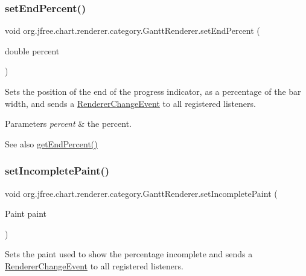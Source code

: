 \subsubsection{\texorpdfstring{set\+End\+Percent()}{setEndPercent()}}
{\footnotesize\ttfamily void org.\+jfree.\+chart.\+renderer.\+category.\+Gantt\+Renderer.\+set\+End\+Percent (\begin{DoxyParamCaption}\item[{double}]{percent }\end{DoxyParamCaption})}

Sets the position of the end of the progress indicator, as a percentage of the bar width, and sends a \mbox{\hyperlink{}{Renderer\+Change\+Event}} to all registered listeners.


\begin{DoxyParams}{Parameters}
{\em percent} & the percent.\\
\hline
\end{DoxyParams}
\begin{DoxySeeAlso}{See also}
\mbox{\hyperlink{classorg_1_1jfree_1_1chart_1_1renderer_1_1category_1_1_gantt_renderer_a4675717c2d315a0b9281d5de28f2a1dd}{get\+End\+Percent()}} 
\end{DoxySeeAlso}
\mbox{\label{classorg_1_1jfree_1_1chart_1_1renderer_1_1category_1_1_gantt_renderer_a6ceb4fd7bbed12681cbb3da2d1d9c57c}} 
\subsubsection{\texorpdfstring{set\+Incomplete\+Paint()}{setIncompletePaint()}}
{\footnotesize\ttfamily void org.\+jfree.\+chart.\+renderer.\+category.\+Gantt\+Renderer.\+set\+Incomplete\+Paint (\begin{DoxyParamCaption}\item[{Paint}]{paint }\end{DoxyParamCaption})}

Sets the paint used to show the percentage incomplete and sends a \mbox{\hyperlink{}{Renderer\+Change\+Event}} to all registered listeners.


